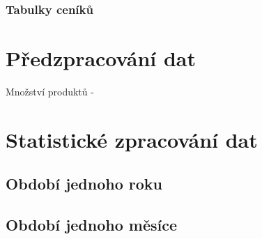 \subsubsection{Tabulky ceníků}


\section{Předzpracování dat}

Množství produktů - 


\section{Statistické zpracování dat}



\subsection{Období jednoho roku}





\subsection{Období jednoho měsíce}





